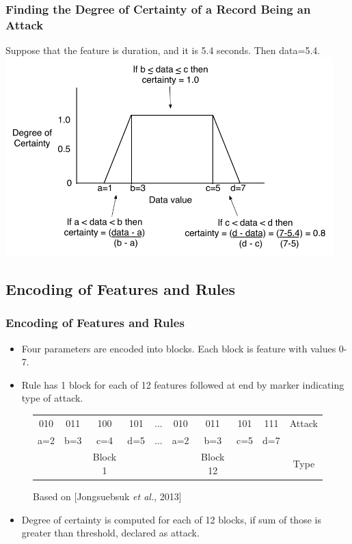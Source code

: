 \documentclass{beamer}
\begin{document}
\begin{frame}
  \frametitle{Finding the Degree of Certainty of a Record Being an Attack}
	Suppose that the feature is duration, and it is 5.4 seconds. Then data=5.4.
  \includegraphics[width=0.95\textwidth]{../trapFigExample.pdf}
\end{frame}


\subsection{Encoding of Features and Rules}
\begin{frame}
	\frametitle{Encoding of Features and Rules}
	\begin{itemize}
	\item Four parameters are encoded into blocks. Each block is feature with values 0-7.
	\item Rule has 1 block for each of 12 features followed at end by marker indicating type of attack.
	\end{itemize}

\begin{figure}
\begin{small}
\begin{tabular}{|cccc|c|cccc|c|} \hline
010 & 011 & 100 & 101   & ... & 010 & 011 & 101 & 111   & Attack\\
a=2 & b=3 & c=4 & d=5   & ... & a=2 & b=3 & c=5 & d=7   &\\ 
    &     & Block 1&    &        &     & Block 12& &       & Type\\
\hline\end{tabular}
\caption{Based on [Jongsuebsuk \emph{et al.}, 2013]}
\end{small}
\end{figure}

	\begin{itemize}
		\item Degree of certainty is computed for each of 12 blocks, if sum of those is greater than threshold, declared as attack.
	\end{itemize}

\end{frame}
\end{document}
